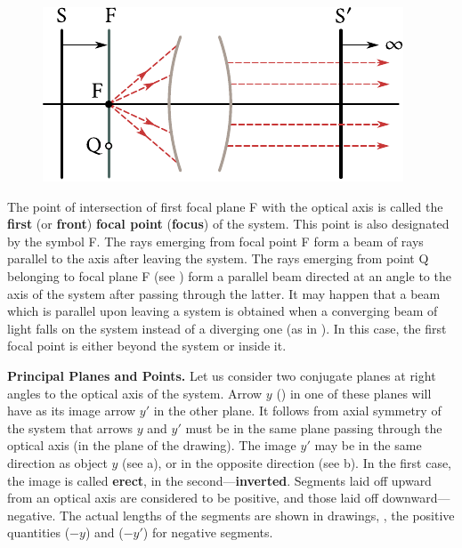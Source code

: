 \begin{figure}[t]
	\begin{center}
		\includegraphics[scale=1]{figures/ch_16/fig_16_14.pdf}
        \caption[]{}
		\label{fig:16_14}
	\end{center}
	\vspace{-0.8cm}
\end{figure}

The point of intersection of first focal plane F with the optical axis is called the \textbf{first} (or \textbf{front}) \textbf{focal point} (\textbf{focus}) of the system.
This point is also designated by the symbol F.
The rays emerging from focal point F form a beam of rays parallel to the axis after leaving the system. The rays emerging from point Q belonging to focal plane F (see ) form a parallel beam directed at an angle to the axis of the system after passing through the latter.
It may happen that a beam which is parallel upon leaving a system is obtained when a converging beam of light falls on the system instead of a diverging one (as in ).
In this case, the first focal point is either beyond the system or inside it.

\textbf{Principal Planes and Points.}
Let us consider two conjugate planes at right angles to the optical axis of the system.
Arrow $y$ () in one of these planes will have as its image arrow $y'$ in the other plane.
It follows from axial symmetry of the system that arrows $y$ and $y'$ must be in the same plane passing through the optical axis (in the plane of the drawing).
The image $y'$ may be in the same direction as object $y$ (see a), or in the opposite direction (see b).
In the first case, the image is called \textbf{erect}, in the second---\textbf{inverted}.
Segments laid off upward from an optical axis are considered to be positive, and those laid off downward---negative.
The actual lengths of the segments are shown in drawings, \ie, the positive quantities ($-y$) and ($-y'$) for negative segments.

